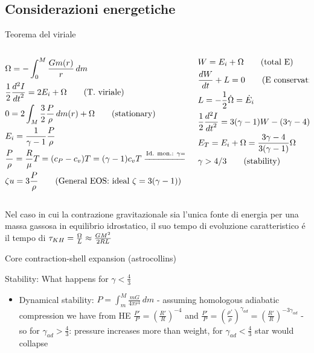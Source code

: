 \subsection{Considerazioni energetiche}

\begin{frame}{Teorema del viriale}
\begin{columns}[T]
	\begin{column}{0.45\textwidth}
		\begin{align*}
&\Omega=-\int_0^M\frac{Gm(r)}{r}\,dm\\
&\frac{1}{2}\TtwoDy{t}{I}=2E_i+\Omega\tag{T. viriale}\\
&0=2\int_M\frac{3}{2}\frac{P}{\rho}\,dm(r)+\Omega\tag{stationary}\\
&E_i=\frac{1}{\gamma-1}\frac{P}{\rho}\\
&\frac{P}{\rho}=\frac{R}{\mu}T=(c_P-c_v)T=(\gamma-1)c_vT\xrightarrow{\text{Id. mon.: } \gamma=\frac{5}{3}}\frac{2}{3}u\\
&\zeta u=3 \frac{P}{\rho}\tag{General EOS: ideal $\zeta=3(\gamma-1)$}
		\end{align*}
	\end{column}\begin{column}{0.55\textwidth}
		\begin{align*}
&W=E_i+\Omega \tag{total E}\\
&\TDy{t}{W}+L=0\tag{E conservation}\\
&L=-\frac{1}{2}\dot{\Omega}=\dot{E}_i\\
&\frac{1}{2}\TtwoDy{t}{I}=3(\gamma-1)W-(3\gamma-4)\Omega\\
&E_T=E_i+\Omega=\frac{3\gamma-4}{3(\gamma-1)}\Omega\\
&\gamma>4/3\tag{stability}
		\end{align*}
	\end{column}
\end{columns}
Nel caso in cui la contrazione gravitazionale sia l'unica fonte di energia per una massa gassosa in equilibrio idrostatico, il suo tempo di evoluzione caratteristico \'e il tempo di \kh{} $\tkh{}=\frac{\Omega}{L}\approx\frac{GM^2}{2RL}$
\end{frame}

\begin{frame}{Core contraction-shell expansion (astrocollins)}

\end{frame}

\frameinlbftrue
\begin{frame}{Stability: What happens for $\gamma<\frac{4}{3}$}

	\begin{itemize}
		\item Dynamical stability: $P=\int_m^M\frac{mG}{4\pi r^4}\,dm$ - assuming homologous adiabatic compression we have from HE $\frac{P'}{P}=(\frac{R'}{R})^{-4}$ and $\frac{P'}{P}=(\frac{\rho'}{\rho})^{\gamma_{ad}}=(\frac{R'}{R})^{-3\gamma_{ad}}$ - so for $\gamma_{ad}>\frac{4}{3}$: pressure increases more than weight, for $\gamma_{ad}<\frac{4}{3}$ star would collapse
		\end{itemize}
	
\end{frame}
\frameinlbffalse
    
